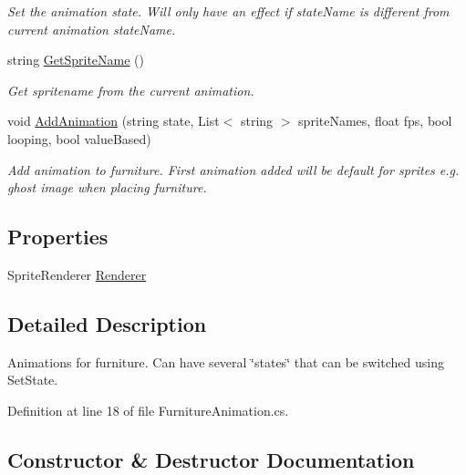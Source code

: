 \begin{DoxyCompactItemize}
\begin{DoxyCompactList}\small\item\em Set the animation state. Will only have an effect if state\+Name is different from current animation state\+Name. \end{DoxyCompactList}\item 
string \hyperlink{class_animation_1_1_furniture_animation_acf54feda77dce0a14221775080c22299}{Get\+Sprite\+Name} ()
\begin{DoxyCompactList}\small\item\em Get spritename from the current animation. \end{DoxyCompactList}\item 
void \hyperlink{class_animation_1_1_furniture_animation_ac1d271b268d374119c337ccc2ef3b5a3}{Add\+Animation} (string state, List$<$ string $>$ sprite\+Names, float fps, bool looping, bool value\+Based)
\begin{DoxyCompactList}\small\item\em Add animation to furniture. First animation added will be default for sprites e.\+g. ghost image when placing furniture. \end{DoxyCompactList}\end{DoxyCompactItemize}
\subsection*{Properties}
\begin{DoxyCompactItemize}
\item 
Sprite\+Renderer \hyperlink{class_animation_1_1_furniture_animation_a0fd63221e8b26694638564218cdb6ec3}{Renderer}
\end{DoxyCompactItemize}


\subsection{Detailed Description}
Animations for furniture. Can have several \char`\"{}states\char`\"{} that can be switched using Set\+State. 



Definition at line 18 of file Furniture\+Animation.\+cs.



\subsection{Constructor \& Destructor Documentation}
\mbox{\label{class_animation_1_1_furniture_animation_ab94f949cb697cba09ca8c73feeebcf0e}} 
